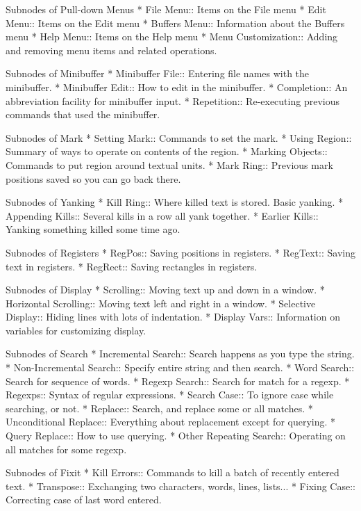 Subnodes of Pull-down Menus
* File Menu::           Items on the File menu
* Edit Menu::           Items on the Edit menu
* Buffers Menu::        Information about the Buffers menu
* Help Menu::           Items on the Help menu
* Menu Customization::  Adding and removing menu items and related
                        operations.

Subnodes of Minibuffer
* Minibuffer File::    Entering file names with the minibuffer.
* Minibuffer Edit::    How to edit in the minibuffer.
* Completion::  An abbreviation facility for minibuffer input.
* Repetition::  Re-executing previous commands that used the minibuffer.

Subnodes of Mark
* Setting Mark::       Commands to set the mark.
* Using Region::       Summary of ways to operate on contents of the region.
* Marking Objects::    Commands to put region around textual units.
* Mark Ring::          Previous mark positions saved so you can go back there.

Subnodes of Yanking
* Kill Ring::          Where killed text is stored.  Basic yanking.
* Appending Kills::    Several kills in a row all yank together.
* Earlier Kills::      Yanking something killed some time ago.

Subnodes of Registers
* RegPos::             Saving positions in registers.
* RegText::            Saving text in registers.
* RegRect::            Saving rectangles in registers.

Subnodes of Display
* Scrolling::	           Moving text up and down in a window.
* Horizontal Scrolling::   Moving text left and right in a window.
* Selective Display::      Hiding lines with lots of indentation.
* Display Vars::           Information on variables for customizing display.

Subnodes of Search
* Incremental Search::     Search happens as you type the string.
* Non-Incremental Search::  Specify entire string and then search.
* Word Search:: 	   Search for sequence of words.
* Regexp Search::	   Search for match for a regexp.
* Regexps::     	   Syntax of regular expressions.
* Search Case::		   To ignore case while searching, or not.
* Replace::     	   Search, and replace some or all matches.
* Unconditional Replace::  Everything about replacement except for querying.
* Query Replace::          How to use querying.
* Other Repeating Search:: Operating on all matches for some regexp.

Subnodes of Fixit
* Kill Errors:: Commands to kill a batch of recently entered text.
* Transpose::   Exchanging two characters, words, lines, lists...
* Fixing Case:: Correcting case of last word entered.

